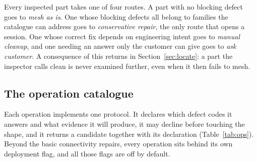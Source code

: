 \documentclass[10pt,onecolumn]{article}
\begin{document}
Every inspected part takes one of four routes. A part with no blocking defect goes to \emph{mesh as
is}. One whose blocking defects all belong to families the catalogue can address goes to
\emph{conservative repair}, the only route that opens a session. One whose correct fix depends on
engineering intent goes to \emph{manual cleanup}, and one needing an answer only the customer can
give goes to \emph{ask customer}. A consequence of this returns in Section~\ref{sec:locate}: a part
the inspector calls clean is never examined further, even when it then fails to mesh.

\subsection{The operation catalogue}

Each operation implements one protocol. It declares which defect codes it answers and what evidence
it will produce, it may decline before touching the shape, and it returns a candidate together with
its declaration (Table~\ref{tab:ops}). Beyond the basic connectivity repairs, every operation sits
behind its own deployment flag, and all those flags are off by default.
\end{document}
